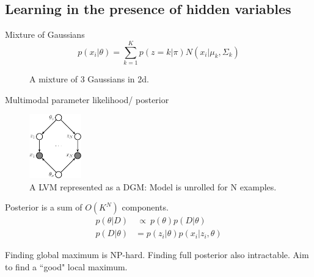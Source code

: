 \documentclass[10pt,mathserif]{beamer}
\begin{document}
        
\subsection{Learning in the presence of hidden variables}
\begin{frame}{Mixture of Gaussians}
\begin{equation}
    p(x_i|\theta) = \sum_{k=1}^K p(z = k|\pi)N(x_i|\mu_k,\Sigma_k)
\end{equation}

\begin{figure}[h]
\centering     %
{}
\caption{A mixture of 3 Gaussians in 2d.}
\end{figure}
\end{frame}

\begin{frame}{Multimodal parameter likelihood/ posterior}
\begin{figure}[h]
\centering
\includegraphics[width=0.2\textwidth]{mixModelDgm}
\caption{A LVM represented as a DGM: Model is unrolled for N examples.}
\end{figure}

Posterior is a sum of $O(K^N)$ components.
\begin{equation}
    \begin{split}
        p(\theta|D) & \ \propto \ p(\theta)p(D|\theta)\\
        p(D|\theta) & = p(z_i |\theta)p(x_i |z_i , \theta)
    \end{split}
\end{equation}

Finding global maximum is NP-hard. Finding full posterior also intractable. Aim to find a ``good" local maximum. 
\end{frame}
\end{document}

